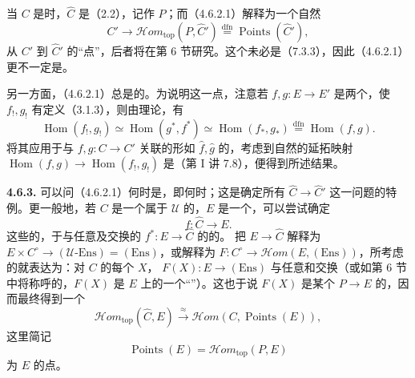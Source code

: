 当 $C$ 是时，$\widehat C$ 是（2.2），记作 $P$；而（4.6.2.1）解释为一个自然
\[
 C'\longrightarrow\mathscr Hom_{\mathrm{top}}(P,\widehat C')\overset{\mathrm{dfn}}=\operatorname{Points}(\widehat C'),\tag{4.6.2.2}
\]
从 $C'$ 到 $\widehat C'$ 的“点”，后者将在第 6 节研究。这个未必是（7.3.3），因此（4.6.2.1）更不一定是。

另一方面，（4.6.2.1）总是的。为说明这一点，注意若 $f,g:E\to E'$ 是两个，使 $f_!,g_!$ 有定义（3.1.3），则由理论，有
\[
 \operatorname{Hom}(f_!,g_!)\simeq\operatorname{Hom}(g^*,f^*)\simeq\operatorname{Hom}(f_*,g_*)\overset{\mathrm{dfn}}=\operatorname{Hom}(f,g).
\]
将其应用于与 $f,g:C\to C'$ 关联的形如 $\widehat f,\widehat g$ 的，考虑到自然的延拓映射 $\operatorname{Hom}(f,g)\to\operatorname{Hom}(f_!,g_!)$ 是（第 I 讲 7.8），便得到所述结果。

\textbf{4.6.3.} 可以问（4.6.2.1）何时是，即何时；这是确定所有 $\widehat C\to\widehat C'$ 这一问题的特例。更一般地，若 $C$ 是一个属于 $\mathcal U$ 的，$E$ 是一个，可以尝试确定
\[
 f:\widehat C\longrightarrow E.
\]
这些的，于与任意及交换的 $f^*:E\to\widehat C$ 的的。
把 $E\to\widehat C$ 解释为 $E\times C^\circ\to(\mathcal U\text{-}\mathrm{Ens})=(\mathrm{Ens})$，或解释为 $F:C^\circ\to\mathscr Hom(E,(\mathrm{Ens}))$，所考虑的就表达为：对 $C$ 的每个 $X$， $F(X):E\to(\mathrm{Ens})$ 与任意和交换（或如第 6 节中将称呼的，$F(X)$ 是 $E$ 上的一个“”）。这也于说 $F(X)$ 是某个 $P\to E$ 的，因而最终得到一个
\[
 \mathscr Hom_{\mathrm{top}}(\widehat C,E)\xrightarrow{\approx}\mathscr Hom(C,\operatorname{Points}(E)),\tag{4.6.3.1}
\]
这里简记
\[
 \operatorname{Points}(E)=\mathscr Hom_{\mathrm{top}}(P,E)
\]
为 $E$ 的点。

